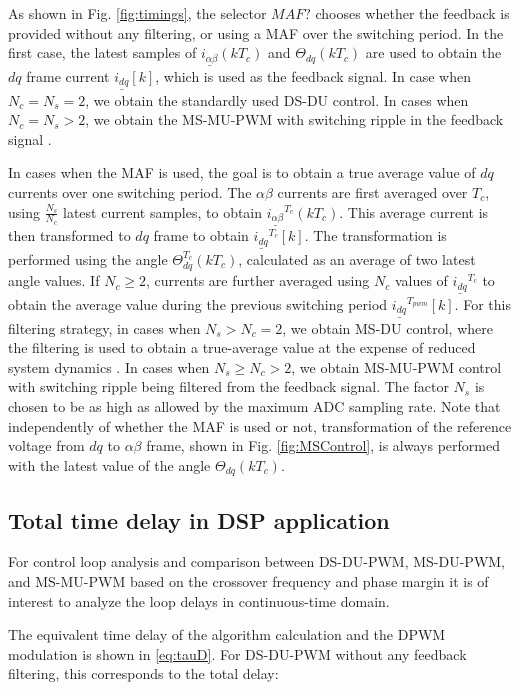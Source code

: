 \documentclass[conference]{IEEEtran}
\begin{document}
As shown in Fig. \ref{fig:timings}, the selector $MAF?$ chooses whether the feedback is provided without any filtering, or using a MAF over the switching period. In the first case, the latest samples of $\underline{i_{\alpha \beta}}(kT_c)$ and $\Theta_{dq}(kT_c)$ are used to obtain the $dq$ frame current $\underline{i_{dq}}[k]$, which is used as the feedback signal. In case when $N_c = N_s = 2$, we obtain the standardly used DS-DU control. In cases when $N_c = N_s > 2$, we obtain the MS-MU-PWM with switching ripple in the feedback signal \cite{Petric2020}.

In cases when the MAF is used, the goal is to obtain a true average value of $dq$ currents over one switching period. The $\alpha \beta$ currents are first averaged over $T_c$, using $\frac{N_s}{N_c}$ latest current samples, to obtain $\underline{i_{\alpha \beta}}^{T_c} (kT_c)$. This average current is then transformed to $dq$ frame to obtain $\underline{i_{dq}}^{T_c} [k]$. The transformation is performed using the angle $\Theta_{dq}^{T_c}(kT_c)$, calculated as an average of two latest angle values. If $N_c\geq 2$, currents are further averaged using $N_c$ values of $\underline{i_{dq}}^{T_c}$ to obtain the average value during the previous switching period $\underline{i_{dq}}^{T_{pwm}}[k]$.
For this filtering strategy, in cases when $N_s>N_c = 2$, we obtain MS-DU control, where the filtering is used to obtain a true-average value at the expense of reduced system dynamics \cite{vuksa2016}. In cases when $N_s \geq N_c > 2$, we obtain MS-MU-PWM control with switching ripple being filtered from the feedback signal. The factor $N_s$ is chosen to be as high as allowed by the maximum ADC sampling rate.
Note that independently of whether the MAF is used or not, transformation of the reference voltage from $dq$ to $\alpha \beta$ frame, shown in Fig. \ref{fig:MSControl}, is always performed with the latest value of the angle $\Theta_{dq}(kT_c)$.

\subsection{Total time delay in DSP application}

For control loop analysis and comparison between DS-DU-PWM, MS-DU-PWM, and MS-MU-PWM based on the crossover frequency and phase margin it is of interest to analyze the loop delays in continuous-time domain.

The equivalent time delay of the algorithm calculation and the DPWM modulation is shown in \eqref{eq:tauD}. For DS-DU-PWM without any feedback filtering, this corresponds to the total delay:
\end{document}

